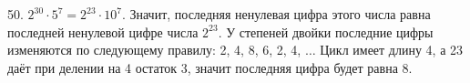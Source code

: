 50. $2^{30}\cdot5^7=2^{23}\cdot10^7.$ Значит, последняя ненулевая цифра этого числа равна последней ненулевой цифре числа $2^{23}.$ У степеней двойки последние цифры изменяются по следующему правилу: 2, 4, 8, 6, 2, 4, $\ldots$ Цикл имеет длину 4, а 23 даёт при делении на 4 остаток 3, значит последняя цифра будет равна 8.\\
